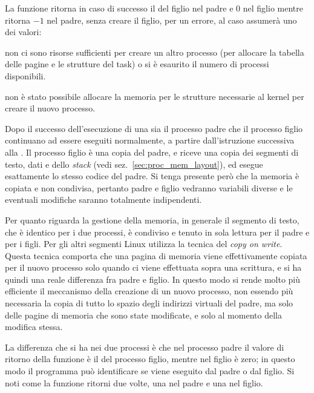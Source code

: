 \begin{funcproto}{ 
}

{La funzione ritorna in caso di successo il  del figlio nel padre e
  $0$ nel figlio mentre ritorna $-1$ nel padre, senza creare il figlio, per un
  errore, al caso  assumerà uno dei valori:
  \begin{errlist}
  \item[\errcode{EAGAIN}] non ci sono risorse sufficienti per creare un altro
    processo (per allocare la tabella delle pagine e le strutture del task) o
    si è esaurito il numero di processi disponibili.
  \item[\errcode{ENOMEM}] non è stato possibile allocare la memoria per le
    strutture necessarie al kernel per creare il nuovo processo.
  \end{errlist}}
\end{funcproto}

Dopo il successo dell'esecuzione di una  sia il processo padre che
il processo figlio continuano ad essere eseguiti normalmente, a partire
dall'istruzione successiva alla . Il processo figlio è una copia
del padre, e riceve una copia dei segmenti di testo, dati e dello
\textit{stack} (vedi sez.~\ref{sec:proc_mem_layout}), ed esegue esattamente lo
stesso codice del padre. Si tenga presente però che la memoria è copiata e non
condivisa, pertanto padre e figlio vedranno variabili diverse e le eventuali
modifiche saranno totalmente indipendenti.


Per quanto riguarda la gestione della memoria, in generale il segmento di
testo, che è identico per i due processi, è condiviso e tenuto in sola lettura
per il padre e per i figli. Per gli altri segmenti Linux utilizza la tecnica
del \textit{copy on write}. Questa tecnica comporta che una pagina di memoria
viene effettivamente copiata per il nuovo processo solo quando ci viene
effettuata sopra una scrittura, e si ha quindi una reale differenza fra padre
e figlio.  In questo modo si rende molto più efficiente il meccanismo della
creazione di un nuovo processo, non essendo più necessaria la copia di tutto
lo spazio degli indirizzi virtuali del padre, ma solo delle pagine di memoria
che sono state modificate, e solo al momento della modifica stessa.


La differenza che si ha nei due processi è che nel processo padre il valore di
ritorno della funzione  è il  del processo figlio, mentre
nel figlio è zero; in questo modo il programma può identificare se viene
eseguito dal padre o dal figlio.  Si noti come la funzione  ritorni
due volte, una nel padre e una nel figlio.

